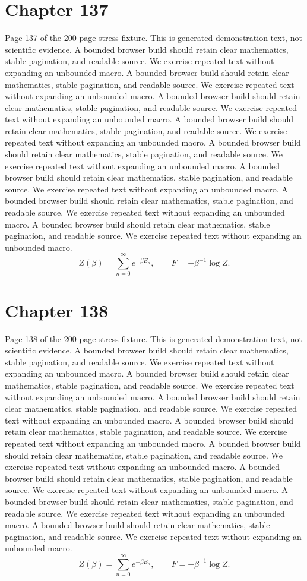 \documentclass[11pt]{article}
\begin{document}
\section*{Chapter 137}
Page 137 of the 200-page stress fixture. This is generated demonstration text, not scientific evidence.
A bounded browser build should retain clear mathematics, stable pagination, and readable source. We exercise repeated text without expanding an unbounded macro.
A bounded browser build should retain clear mathematics, stable pagination, and readable source. We exercise repeated text without expanding an unbounded macro.
A bounded browser build should retain clear mathematics, stable pagination, and readable source. We exercise repeated text without expanding an unbounded macro.
A bounded browser build should retain clear mathematics, stable pagination, and readable source. We exercise repeated text without expanding an unbounded macro.
A bounded browser build should retain clear mathematics, stable pagination, and readable source. We exercise repeated text without expanding an unbounded macro.
A bounded browser build should retain clear mathematics, stable pagination, and readable source. We exercise repeated text without expanding an unbounded macro.
A bounded browser build should retain clear mathematics, stable pagination, and readable source. We exercise repeated text without expanding an unbounded macro.
A bounded browser build should retain clear mathematics, stable pagination, and readable source. We exercise repeated text without expanding an unbounded macro.
\[Z(\beta)=\sum_{n=0}^{\infty}e^{-\beta E_n},\qquad F=-\beta^{-1}\log Z.\]
\newpage
\section*{Chapter 138}
Page 138 of the 200-page stress fixture. This is generated demonstration text, not scientific evidence.
A bounded browser build should retain clear mathematics, stable pagination, and readable source. We exercise repeated text without expanding an unbounded macro.
A bounded browser build should retain clear mathematics, stable pagination, and readable source. We exercise repeated text without expanding an unbounded macro.
A bounded browser build should retain clear mathematics, stable pagination, and readable source. We exercise repeated text without expanding an unbounded macro.
A bounded browser build should retain clear mathematics, stable pagination, and readable source. We exercise repeated text without expanding an unbounded macro.
A bounded browser build should retain clear mathematics, stable pagination, and readable source. We exercise repeated text without expanding an unbounded macro.
A bounded browser build should retain clear mathematics, stable pagination, and readable source. We exercise repeated text without expanding an unbounded macro.
A bounded browser build should retain clear mathematics, stable pagination, and readable source. We exercise repeated text without expanding an unbounded macro.
A bounded browser build should retain clear mathematics, stable pagination, and readable source. We exercise repeated text without expanding an unbounded macro.
\[Z(\beta)=\sum_{n=0}^{\infty}e^{-\beta E_n},\qquad F=-\beta^{-1}\log Z.\]
\newpage
\end{document}

